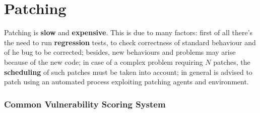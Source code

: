 \chapter{Patching}

Patching is \textbf{slow} and \textbf{expensive}.
This is due to many factors:
first of all there's the need to run \textbf{regression} tests, to check correctness of standard behaviour and of he bug to be corrected;
besides, new behaviours and problems may arise because of the new code;
in case of a complex problem requiring $N$ patches,
the \textbf{scheduling} of such patches must be taken into account;
in general is advised to patch using an automated process exploiting patching agents and environment.

\subsection{Common Vulnerability Scoring System}

